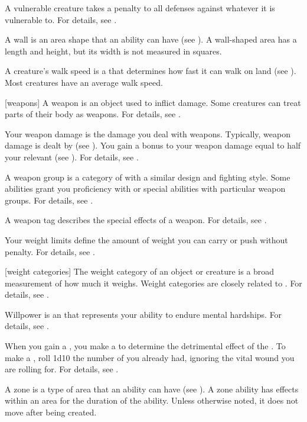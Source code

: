  A vulnerable creature takes a  penalty to all defenses against whatever it is vulnerable to.
For details, see .

 A wall is an area shape that an ability can have (see ).
A wall-shaped area has a length and height, but its width is not measured in squares.

 A creature's walk speed is a  that determines how fast it can walk on land (see ).
Most creatures have an average walk speed.

[weapons] A weapon is an object used to inflict damage.
Some creatures can treat parts of their body as weapons.
For details, see .

 Your weapon damage is the damage you deal with weapons.
Typically, weapon damage is dealt by  (see ).
You gain a bonus to your weapon damage equal to half your relevant  (see ).
For details, see .

 A weapon group is a category of  with a similar design and fighting style.
Some abilities grant you proficiency with or special abilities with particular weapon groups.
For details, see .

 A weapon tag describes the special effects of a weapon.
For details, see .

 Your weight limits define the amount of weight you can carry or push without penalty.
For details, see .

[weight categories] The weight category of an object or creature is a broad measurement of how much it weighs.
Weight categories are closely related to .
For details, see .

 Willpower is an  that represents your ability to endure mental hardships.
For details, see .

 When you gain a , you make a  to determine the detrimental effect of the .
To make a , roll 1d10 \sub the number of  you already had, ignoring the vital wound you are rolling for.
For details, see .

 A zone is a type of area that an ability can have (see ).
A zone ability has effects within an area for the duration of the ability.
Unless otherwise noted, it does not move after being created.

